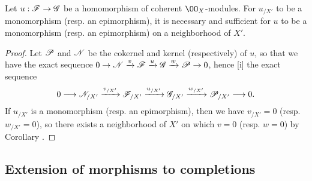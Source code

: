 \begin{cor}[10.8.14]
\label{1.10.8.14}
Let $u:\sh{F}\to\sh{G}$ be a homomorphism of coherent $\OO_X$-modules.
For $u_{/X'}$ to be a monomorphism (resp. an epimorphism), it is necessary and sufficient for $u$ to be a monomorphism (resp. an epimorphism) on a neighborhood of $X'$.
\end{cor}

\begin{proof}
\label{proof-1.10.8.14}
Let $\mathscr{P}$ and $\mathscr{N}$ be the cokernel and kernel (respectively) of $u$, so that we have the exact sequence $0\to\sh{N}\xrightarrow{v}\sh{F}\xrightarrow{u}\sh{G}\xrightarrow{w}\sh{P}\to 0$, hence [i] the exact sequence
\[
  0\to\sh{N}_{/X'}\xrightarrow{v_{/X'}}\sh{F}_{/X'}\xrightarrow{u_{/X'}}\sh{G}_{/X'}\xrightarrow{w_{/X'}}\sh{P}_{/X'}\to 0.
\]
If $u_{/X'}$ is a monomorphism (resp. an epimorphism), then we have $v_{/X'}=0$ (resp. $w_{/X'}=0$), so there exists a neighborhood of $X'$ on which $v=0$ (resp. $w=0$) by Corollary .
\end{proof}

\subsection{Extension of morphisms to completions}
\label{subsection:1.10.9}

